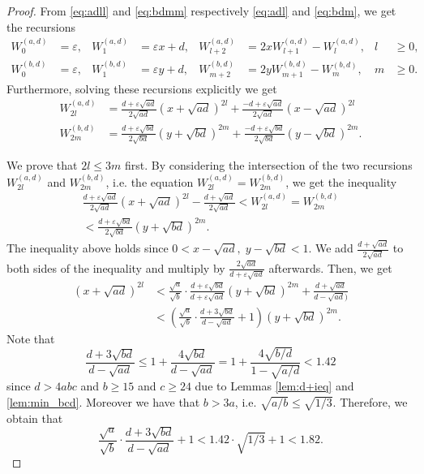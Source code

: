 \documentclass{amsart}
\theoremstyle{definition}
\begin{document}
\begin{proof}
From \eqref{eq:adll} and \eqref{eq:bdmm} respectively \eqref{eq:adl} and \eqref{eq:bdm}, we get the recursions
\begin{align*}
W^{(a,d)}_0&=\varepsilon,& W^{(a,d)}_1 &= \varepsilon x+ d,& W^{(a,d)}_{l+2}& =2xW^{(a,d)}_{l+1}-W^{(a,d)}_{l},& l &\ge 0, \\
W^{(b,d)}_0&=\varepsilon,& W^{(b,d)}_1 &= \varepsilon y+ d,& W^{(b,d)}_{m+2}& =2yW^{(b,d)}_{m+1}-W^{(b,d)}_{m},& m &\ge 0.
\end{align*}
Furthermore, solving these recursions explicitly we get
\begin{align*}
W_{2l}^{(a,d)}&=\frac{d+\varepsilon\sqrt{ad}}{2\sqrt{ad}}\left(x+\sqrt{ad}\right)^{2l}+\frac{-d+\varepsilon\sqrt{ad}}{2\sqrt{ad}}\left(x-\sqrt{ad}\right)^{2l}\\
W_{2m}^{(b,d)}&=\frac{d+\varepsilon\sqrt{bd}}{2\sqrt{bd}}\left(y+\sqrt{bd}\right)^{2m}+\frac{-d+\varepsilon\sqrt{bd}}{2\sqrt{bd}}\left(y-\sqrt{bd}\right)^{2m}.
\end{align*}

We prove that $2l\le 3 m$ first. By considering the intersection of the two recursions $W^{(a,d)}_{2l}$ and $W^{(b,d)}_{2m}$, i.e. the equation $W^{(a,d)}_{2l} = W^{(b,d)}_{2m}$, we get the inequality
\begin{multline*}
\frac{d+\varepsilon\sqrt{ad}}{2\sqrt{ad}}\left(x+\sqrt{ad}\right)^{2l}-\frac{d+\sqrt{ad}}{2\sqrt{ad}}<W^{(a,d)}_{2l} = W^{(b,d)}_{2m}\\
< \frac{d+\varepsilon\sqrt{bd}}{2\sqrt{bd}}\left(y+\sqrt{bd}\right)^{2m}.
\end{multline*}
The inequality above holds since $0<x-\sqrt{ad},\; y-\sqrt{bd}<1$. We add $\frac{d+\sqrt{ad}}{2\sqrt{ad}}$ to both sides of the inequality and multiply by $\frac{2\sqrt{ad}}{d+\varepsilon\sqrt{ad}}$ afterwards. Then, we get
\begin{align*}
(x+\sqrt{ad})^{2l}&<\frac{\sqrt{a}}{\sqrt{b}}\cdot\frac{d+\varepsilon\sqrt{bd}}{d+\varepsilon\sqrt{ad}}(y+\sqrt{bd})^{2m}+\frac{d+\sqrt{ad}}{d-\sqrt{ad})}\\
&<\left(\frac{\sqrt{a}}{\sqrt{b}}\cdot \frac{d+3\sqrt{bd}}{d-\sqrt{ad}}+1\right)(y+\sqrt{bd})^{2m}.
\end{align*}
Note that
$$\frac{d+3\sqrt{bd}}{d-\sqrt{ad}}\leq 1+\frac{4\sqrt{bd}}{d-\sqrt{ad}}=1+\frac{4\sqrt{b/d}}{1-\sqrt{a/d}}< 1.42$$
since $d>4abc$ and $b\geq 15$ and $c\geq 24$ due to Lemmas \ref{lem:d+ieq} and \ref{lem:min_bcd}. Moreover we have that $b>3a$, i.e. $\sqrt{a/b}\leq \sqrt{1/3}$. Therefore, we obtain that 
$$\frac{\sqrt{a}}{\sqrt{b}}\cdot \frac{d+3\sqrt{bd}}{d-\sqrt{ad}}+1<1.42\cdot \sqrt{1/3}+1<1.82.$$


\end{proof}
\end{document}
